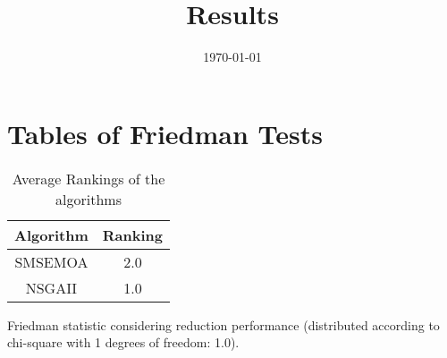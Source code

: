 \documentclass{article}
\title{Results}
\author{}
\date{\today}
\begin{document}
\oddsidemargin 0in \topmargin 0in\maketitle
\section{Tables of Friedman Tests}
\begin{table}[!htp]
\centering
\caption{Average Rankings of the algorithms
}\begin{tabular}{c|c}
Algorithm&Ranking\\
\hline
SMSEMOA&2.0\\
NSGAII&1.0\\
\end{tabular}
\end{table}


Friedman statistic considering reduction performance (distributed according to chi-square with 1 degrees of freedom: 1.0).
\end{document}
